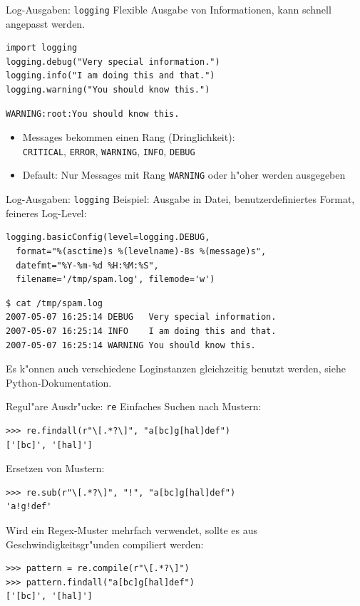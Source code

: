 \begin{frame}[fragile]{Log-Ausgaben: \texttt{logging}}
Flexible Ausgabe von Informationen, kann schnell angepasst werden.
\begin{lstlisting}[style=Python]
import logging
logging.debug("Very special information.")
logging.info("I am doing this and that.")
logging.warning("You should know this.")
\end{lstlisting}
\begin{lstlisting}[style=shell]
WARNING:root:You should know this.
\end{lstlisting}
\begin{itemize}
\item Messages bekommen einen Rang (Dringlichkeit):\\
 \texttt{CRITICAL}, \texttt{ERROR}, \texttt{WARNING}, \texttt{INFO}, \texttt{DEBUG}
\item Default: Nur Messages mit Rang \texttt{WARNING} oder h"oher werden ausgegeben
\end{itemize}
\end{frame}

\begin{frame}[fragile]{Log-Ausgaben: \texttt{logging}}
Beispiel: Ausgabe in Datei, benutzerdefiniertes Format, feineres Log-Level:
\begin{lstlisting}[style=Python, basicstyle=\ttfamily\small]
logging.basicConfig(level=logging.DEBUG,
  format="%(asctime)s %(levelname)-8s %(message)s",
  datefmt="%Y-%m-%d %H:%M:%S",
  filename='/tmp/spam.log', filemode='w')
\end{lstlisting}
\begin{lstlisting}[style=Shell, basicstyle=\ttfamily\small]
$ cat /tmp/spam.log
2007-05-07 16:25:14 DEBUG   Very special information.
2007-05-07 16:25:14 INFO    I am doing this and that.
2007-05-07 16:25:14 WARNING You should know this.
\end{lstlisting} %
Es k"onnen auch verschiedene Loginstanzen gleichzeitig benutzt werden,
siehe Python-Dokumentation.
\end{frame}

\begin{frame}[fragile]{Regul"are Ausdr"ucke: \texttt{re}}
Einfaches Suchen nach Mustern:
\begin{lstlisting}[style=Shell]
>>> re.findall(r"\[.*?\]", "a[bc]g[hal]def")
['[bc]', '[hal]']
\end{lstlisting}
\vspace*{2mm}
Ersetzen von Mustern:
\begin{lstlisting}[style=Shell]
>>> re.sub(r"\[.*?\]", "!", "a[bc]g[hal]def")
'a!g!def'
\end{lstlisting}
\vspace*{2mm}
Wird ein Regex-Muster mehrfach verwendet, sollte es aus Geschwindigkeitsgr"unden compiliert werden:
\begin{lstlisting}[style=Shell]
>>> pattern = re.compile(r"\[.*?\]")
>>> pattern.findall("a[bc]g[hal]def")
['[bc]', '[hal]']
\end{lstlisting}
\end{frame}

